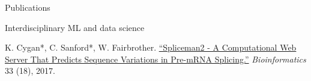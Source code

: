 \documentclass{cv} %
\begin{document}
\begin{rSection}{Publications}
\begin{rSubsection}{Interdisciplinary ML and data science}{}{}{}{}
\item K. Cygan*, C. Sanford*, W. Fairbrother. \href{https://academic.oup.com/bioinformatics/article/33/18/2943/3887237?login=true}{``Spliceman2 - A Computational Web Server That Predicts Sequence Variations in Pre-mRNA Splicing.''}
\textit{Bioinformatics} 33 (18), 2017.
\end{rSubsection}
%
%
%
%
%
%
%
%
%
%
%
%
%
%
%
%
%
\end{rSection}
\end{document}
